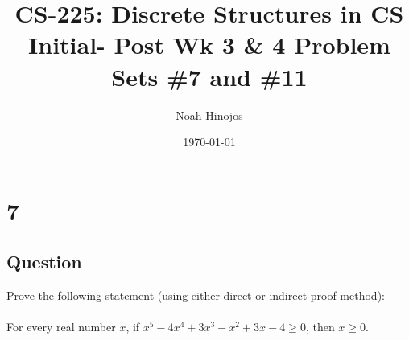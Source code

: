 \documentclass[12pt]{article}
\title{
  \textbf{CS-225: Discrete Structures in CS} \\
  Initial- Post Wk 3 \& 4 Problem Sets \#7 and \#11
  }
\author{Noah Hinojos}
\date{\today}
\begin{document}
\maketitle

\section*{7}
\subsection*{Question}
Prove the following statement (using either direct or indirect proof method): \\ \\
For every real number $x$, if $x^5 - 4x^4 + 3x^3 - x^2 + 3x - 4 \geq 0$, then $x \geq 0$.
\end{document}
